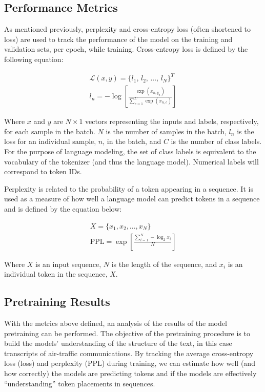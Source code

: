 \documentclass[12pt]{article}
\begin{document}
\subsection{Performance Metrics}\label{sec:performance_metrics}
As mentioned previously, perplexity and cross-entropy loss (often shortened to loss) are used to track the performance of the model on the training
and validation sets, per epoch, while training. Cross-entropy loss is defined by the following equation:

\begin{equation}\label{eq:cross_entropy_loss}
    \begin{gathered}
        \mathcal{L}(x, y) = \{\mbox{$l_1$, $l_2$, ..., $l_N$}\}^T\\
        l_n = -\log \left[\frac{\exp(x_{n,y_n})}{\sum_{c=1}^{C}\exp(x_{n,c})}\right]
    \end{gathered}
\end{equation}

\noindent
Where $x$ and $y$ are $N \times 1$ vectors representing the inputs and labels, respectively, for each sample in the batch. $N$ is the number of
samples in the batch, $l_n$ is the loss for an individual sample, $n$, in the batch, and $C$ is the number of class labels. For the purpose of
language modeling, the set of class labels is equivalent to the vocabulary of the tokenizer (and thus the language model). Numerical labels will
correspond to token IDs.

Perplexity is related to the probability of a token appearing in a sequence. It is used as a measure of how well a language model can predict tokens
in a sequence and is defined by the equation below:

\begin{equation}\label{eq:perplexity}
    \begin{gathered}
        X = \{x_1, x_2, ..., x_N\}\\
        \mbox{PPL} = \exp\left[\frac{\sum_{i=1}^N - \log_2 x_i}{N}\right]
    \end{gathered}
\end{equation}

\noindent
Where $X$ is an input sequence, $N$ is the length of the sequence, and $x_i$ is an individual token in the sequence, $X$.

\subsection{Pretraining Results}\label{sec:pretraining_results}
With the metrics above defined, an analysis of the results of the model pretraining can be performed. The objective of the pretraining procedure is to
build the models' understanding of the structure of the text, in this case transcripts of air-traffic communications. By tracking the average
cross-entropy loss (loss) and perplexity (PPL) during training, we can estimate how well (and how correctly) the models are predicting tokens and if
the models are effectively ``understanding'' token placements in sequences.
\end{document}
